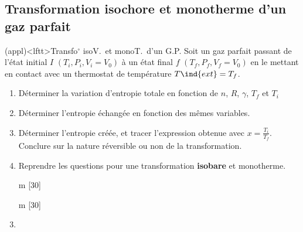 \documentclass[../../main/main.tex]{subfiles}
\begin{document}
\subsection{Transformation isochore et monotherme d'un gaz parfait}
\begin{tcb*}[breakable](appl)<lftt>{Transfo$^\circ$ isoV.\ et monoT.\ d'un G.P.}
	Soit un gaz parfait passant de l'état initial $I$ $(T_i, P_i, V_i = V_0)$ à
	un état final $f$ $(T_f, P_f, V_f = V_0)$ en le mettant en contact avec un
	thermostat de température $T\ind{ext} = T_f$.
	\begin{enumerate}[label=\sqenumi]
		\item Déterminer la variation d'entropie totale en fonction de $n$, $R$,
		      $\gamma$, $T_f$ et $T_i$
		\item Déterminer l'entropie échangée en fonction des mêmes variables.
		\item Déterminer l'entropie créée, et tracer l'expression obtenue avec $x
			      = \frac{T_i}{T_f}$. Conclure sur la nature réversible ou non de la
		      transformation.
		\item Reprendre les questions pour une transformation \textbf{isobare} et
		      monotherme.
	\end{enumerate}
	\tcblower
	\begin{enumerate}[label=\sqenumi]
		\item[m][30]
		\vspace{-20pt}
		\item[m][30]
		\item ~
		      \smallbreak

\end{enumerate}
\end{tcb*}
\end{document}
